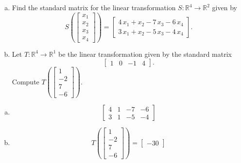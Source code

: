 
\begin{exerciseStatement}

\begin{enumerate}[(a)]
\item Find the standard matrix for the linear transformation \(S:\mathbb{R}^ 4  \to \mathbb{R}^ 2 \) given by \[S\left(  \left[\begin{array}{c}
x_{1} \\
x_{2} \\
x_{3} \\
x_{4}
\end{array}\right]  \right) =  \left[\begin{array}{c}
4 \, x_{1} + x_{2} - 7 \, x_{3} - 6 \, x_{4} \\
3 \, x_{1} + x_{2} - 5 \, x_{3} - 4 \, x_{4}
\end{array}\right] .\]
\item Let \(T:\mathbb{R}^ 4  \to \mathbb{R}^ 1 \) be the linear transformation given by the standard matrix \[ \left[\begin{array}{cccc}
1 & 0 & -1 & 4
\end{array}\right] .\] Compute \(T\left( \left[\begin{array}{c}
1 \\
-2 \\
7 \\
-6
\end{array}\right]  \right)\). 
\end{enumerate}
    
\end{exerciseStatement}
    
\begin{exerciseAnswer} 

\begin{enumerate}[(a)]
\item \[ \left[\begin{array}{cccc}
4 & 1 & -7 & -6 \\
3 & 1 & -5 & -4
\end{array}\right] \]
\item \[T\left( \left[\begin{array}{c}
1 \\
-2 \\
7 \\
-6
\end{array}\right]  \right)= \left[\begin{array}{c}
-30
\end{array}\right] \]
\end{enumerate}
    
\end{exerciseAnswer}
    
